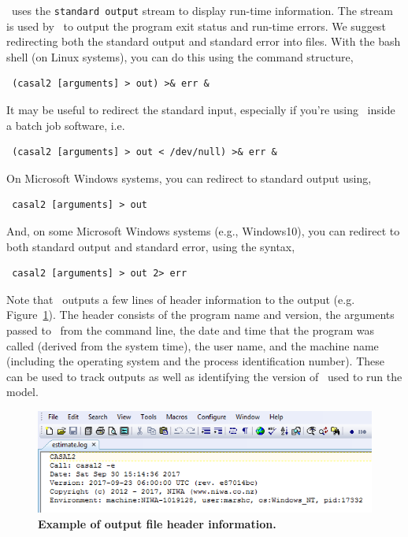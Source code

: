 \CNAME\ uses the \texttt{standard output} stream to display run-time information. The  stream is used by \CNAME\ to output the program exit status and run-time errors. We suggest redirecting both the standard output and standard error into files. With the bash shell (on Linux systems), you can do this using the command structure,

\begin{verbatim} (casal2 [arguments] > out) >& err &\end{verbatim}

It may be useful to redirect the standard input, especially if you're using \CNAME\ inside a batch job software, i.e.

\begin{verbatim} (casal2 [arguments] > out < /dev/null) >& err &\end{verbatim}

On Microsoft Windows systems, you can redirect to standard output using,

\begin{verbatim} casal2 [arguments] > out\end{verbatim}

And, on some Microsoft Windows systems (e.g., Windows10), you can redirect to both standard output and standard error, using the syntax,

\begin{verbatim} casal2 [arguments] > out 2> err\end{verbatim}

Note that \CNAME\ outputs a few lines of header information to the output (e.g. Figure~\ref{fig:log_file_1}). The header consists of the program name and version, the arguments passed to \CNAME\ from the command line, the date and time that the program was called (derived from the system time), the user name, and the machine name (including the operating system and the process identification number). These can be used to track outputs as well as identifying the version of \CNAME\ used to run the model.

\begin{figure}[htp]
	\includegraphics[scale=1]{Figures/eglog.png}
	\caption{\textbf{Example of output file header information.}}\label{fig:log_file_1}
\end{figure}

